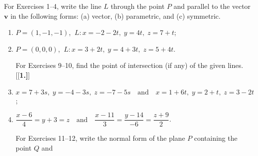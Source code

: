 \centerline{}\label{sec1dot5}
\par\noindent For Exercises 1--4, write the line $L$ through the point $P$ and parallel to the vector $\mathbf{v}$ in the
 following forms: (a) vector, (b) parametric, and (c) symmetric.
\begin{enumerate}[\bfseries 1.]
\par\noindent For Exercises 5--6, write the line $L$ through the points $\ssub{P}{1}$ and $\ssub{P}{2}$ in parametric
form.
[{[\bfseries 1.]}]
\par\noindent For Exercises 7--8, (a) find the distance $d$ from the point $P$ to the line $L$ (b) find the orthogonal projection of $P$ to $L$
[{[\bfseries 1.]}]
 \item $P = (1,-1,-1)$, $~L: x = -2 - 2t, \; y = 4t, \; z = 7 + t$;
 \item $P = (0,0,0)$, $~L: x = 3 + 2t, \; y = 4 + 3t, \; z = 5 + 4t$.
\par\noindent For Exercises 9--10, find the point of intersection (if any) of the given lines.
[{[\bfseries 1.]}]
 \item $x = 7 + 3s, \; y = -4 - 3s, \; z = -7 - 5s \quad \text{and} \quad x = 1 + 6t, \; y = 2 + t, \; z = 3 - 2t$;
 \item $\dfrac{x - 6}{4} = y + 3 = z \quad \text{and} \quad \dfrac{x - 11}{3} = \dfrac{y - 14}{-6} =
  \dfrac{z + 9}{2}$.
\par\noindent For Exercises 11--12, write the normal form of the plane $P$ containing the point $Q$ and

\end{enumerate}
